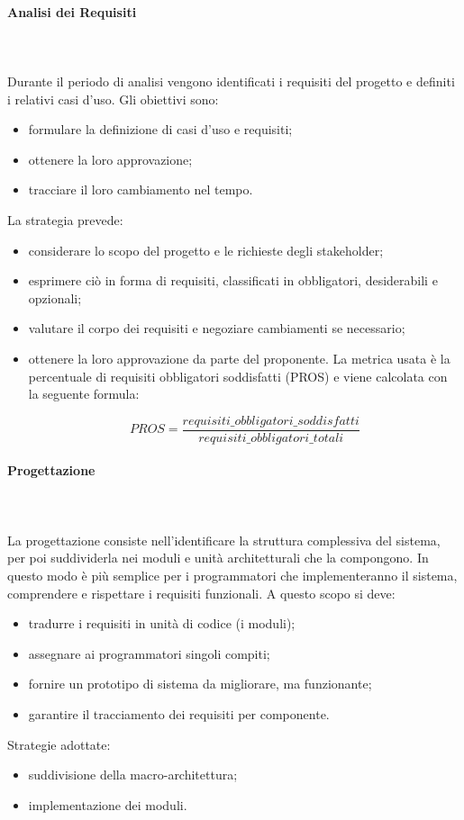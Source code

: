 			\paragraph*{Analisi dei Requisiti} \mbox{} \\ \mbox{} \\
			Durante il periodo di analisi vengono identificati i requisiti del progetto e definiti i relativi casi d'uso. 
			Gli obiettivi sono:
			\begin{itemize}
			\item  formulare la definizione di casi d'uso e requisiti;
			\item ottenere la loro approvazione;
			\item tracciare il loro cambiamento nel tempo.
			\end{itemize}
			La strategia prevede:
			\begin{itemize}
			\item considerare lo scopo del progetto e le richieste degli stakeholder;
			\item esprimere ciò in forma di requisiti, classificati in obbligatori, desiderabili e opzionali;
			\item valutare il corpo dei requisiti e negoziare cambiamenti se necessario;
			\item ottenere la loro approvazione da parte del proponente.
			La metrica usata è la percentuale di requisiti obbligatori soddisfatti (PROS) e viene
calcolata con la seguente formula: 

		\[ PROS = \frac{requisiti\_obbligatori\_soddisfatti}{requisiti\_obbligatori\_totali} \]
	
			\end{itemize}
			\paragraph{Progettazione} \mbox{} \\ \mbox{} \\
			La progettazione consiste nell'identificare la struttura complessiva del sistema, per poi suddividerla nei moduli e unità architetturali che la compongono. In questo modo è più semplice per i programmatori che implementeranno il sistema, comprendere e rispettare i requisiti funzionali.
			A questo scopo si deve:
			\begin{itemize}
			\item tradurre i requisiti in unità di codice (i moduli);
			\item assegnare ai programmatori singoli compiti;
			\item fornire un prototipo di sistema da migliorare, ma funzionante;
			\item garantire il tracciamento dei requisiti per componente.
			\end{itemize}
			Strategie adottate:
			\begin{itemize}			
			\item suddivisione della macro-architettura;
			\item implementazione dei moduli.
			\end{itemize}
